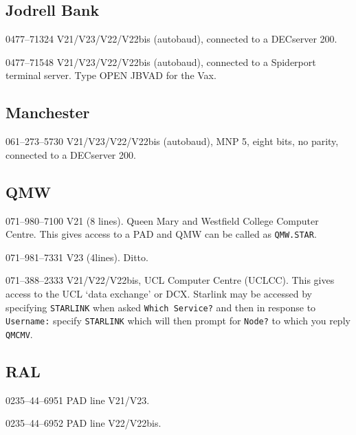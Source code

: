 \subsection{Jodrell Bank}
\begin{list}{}{\setlength{\labelwidth}{\numlen}\setlength{\leftmargin}{\numlen}
\addtolength{\leftmargin}{\labelsep}}
\item[0477--71324] V21/V23/V22/V22bis (autobaud), connected to a DECserver
200.
\item[0477--71548] V21/V23/V22/V22bis (autobaud), connected to a Spiderport
terminal server. Type OPEN JBVAD for the Vax.
\end{list}

\subsection{Manchester}
\begin{list}{}{\setlength{\labelwidth}{\numlen}\setlength{\leftmargin}{\numlen}
\addtolength{\leftmargin}{\labelsep}}
\item[061--273--5730] V21/V23/V22/V22bis (autobaud), MNP 5, eight bits,
no parity, connected to a DECserver 200.
\end{list}

\subsection{QMW}
\begin{list}{}{\setlength{\labelwidth}{\numlen}\setlength{\leftmargin}{\numlen}
\addtolength{\leftmargin}{\labelsep}}
\item[071--980--7100] V21 (8 lines). Queen Mary and Westfield College Computer
Centre. This gives access to a PAD and QMW can be called as {\tt QMW.STAR}.
\item[071--981--7331] V23 (4lines). Ditto.
\item[071--388--2333] V21/V22/V22bis, UCL Computer Centre (UCLCC). This
gives access to the UCL `data exchange' or DCX. Starlink may be accessed by
specifying {\tt STARLINK} when asked {\tt Which Service?} and then in
response to {\tt Username:} specify {\tt STARLINK} which will then prompt
for {\tt Node?} to which you reply {\tt QMCMV}.
\end{list}

\subsection{RAL}
\begin{list}{}{\setlength{\labelwidth}{\numlen}\setlength{\leftmargin}{\numlen}
\addtolength{\leftmargin}{\labelsep}}
\item[0235--44--6951] PAD line V21/V23.
\item[0235--44--6952] PAD line V22/V22bis.
\end{list}

